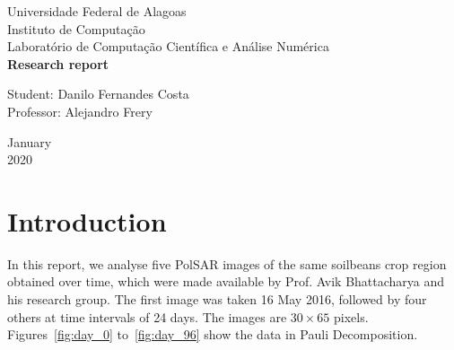 \documentclass[12pt]{article}
\begin{document}

\begin{titlepage}
\begin{center}

\Huge{Universidade Federal de Alagoas}\\
\large{Instituto de Computação}\\ 
\large{Laboratório de Computação Científica e Análise Numérica}\\ 
\vspace{220pt}
\textbf{\LARGE{Research report}}\\
\vspace{3,5cm}
\end{center}

\begin{flushleft}
\begin{tabbing}
Student: Danilo Fernandes Costa\\
Professor: Alejandro Frery\\
\end{tabbing}
\end{flushleft}
\vspace{1cm}

\begin{center}
\vspace{\fill}
January\\
2020
\end{center}
\end{titlepage}

\section{Introduction}

In this report, we analyse five PolSAR images of the same soilbeans crop region obtained over time, which were made available by Prof. Avik Bhattacharya and his research group. 
The first image was taken 16 May 2016, followed by four others at time intervals of \num{24} days. 
The images are $30 \times 65$ pixels.
Figures~\ref{fig:day_0} to~\ref{fig:day_96} show the data in Pauli Decomposition. 
\end{document}
